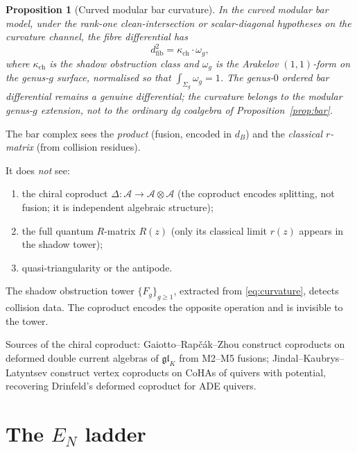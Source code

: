 \documentclass[11pt]{article}
\newtheorem{proposition}[theorem]{Proposition}
\theoremstyle{remark}
\providecommand{\cA}{\mathcal{A}}
\providecommand{\fgl}{\mathfrak{gl}}
\begin{document}
\begin{proposition}[Curved modular bar curvature]\label{prop:curvature}
In the curved modular bar model, under the rank-one clean-intersection
or scalar-diagonal hypotheses on the curvature channel, the fibre
differential has
\begin{equation}\label{eq:curvature}
d_{\mathrm{fib}}^2 = \kappa_{\mathrm{ch}} \cdot \omega_g,
\end{equation}
where $\kappa_{\mathrm{ch}}$ is the shadow obstruction class and
$\omega_g$ is the Arakelov $(1,1)$-form on the genus-$g$ surface,
normalised so that $\int_{\Sigma_g} \omega_g = 1$.
The genus-$0$ ordered bar differential remains a genuine differential;
the curvature belongs to the modular genus-$g$ extension, not to the
ordinary dg coalgebra of Proposition~\ref{prop:bar}.
\end{proposition}

The bar complex sees the \emph{product} (fusion, encoded in $d_B$)
and the \emph{classical $r$-matrix} (from collision residues).

It does \emph{not} see:
\begin{enumerate}[label=(\roman*)]
\item the chiral coproduct $\Delta \colon \cA \to \cA \otimes \cA$
  (the coproduct encodes splitting, not fusion; it is independent
  algebraic structure);
\item the full quantum $R$-matrix $R(z)$ (only its classical limit
  $r(z)$ appears in the shadow tower);
\item quasi-triangularity or the antipode.
\end{enumerate}

The shadow obstruction tower $\{F_g\}_{g \ge 1}$, extracted from
\eqref{eq:curvature}, detects collision data.  The coproduct encodes
the opposite operation and is invisible to the tower.

Sources of the chiral coproduct: Gaiotto--Rap\v{c}\'ak--Zhou
\cite{GRZ} construct coproducts on deformed double current algebras
of $\fgl_K$ from M2--M5 fusions;
Jindal--Kaubrys--Latyntsev \cite{JKL} construct vertex coproducts
on CoHAs of quivers with potential, recovering Drinfeld's deformed
coproduct for ADE quivers.


\section{The $E_N$ ladder}
\label{sec:ladder}
\end{document}
